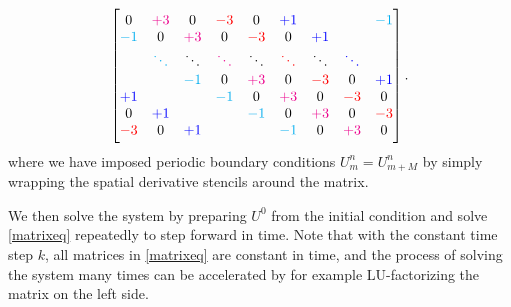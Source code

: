 \begin{equation*}
\begin{bmatrix}
0           & \color{magenta} +3      & 0           & \color{red} -3      & 0           & \color{blue} +1      &             &             & \color{cyan} -1      \\
\color{cyan} -1      & 0           & \color{magenta} +3      & 0           & \color{red} -3      & 0           & \color{blue} +1      &             &             \\
            & \color{cyan} \ddots  & \ddots      & \color{magenta} \ddots  & \ddots      & \color{red} \ddots  & \ddots      & \color{blue} \ddots  &             \\
            &             & \color{cyan} -1      & 0           & \color{magenta} +3      & 0           & \color{red} -3      & 0           & \color{blue} +1      \\
\color{blue} +1      &             &             & \color{cyan} -1      & 0           & \color{magenta} +3      & 0           & \color{red} -3      & 0           \\
0           & \color{blue} +1      &             &             & \color{cyan} -1      & 0           & \color{magenta} +3      & 0           & \color{red} -3      \\
\color{red} -3      & 0           & \color{blue} +1      &             &             & \color{cyan} -1      & 0           & \color{magenta} +3      & 0           \\
\end{bmatrix}
.
\end{equation*}
where we have imposed periodic boundary conditions $U_m^n = U_{m+M}^n$ by simply wrapping the spatial derivative stencils around the matrix.

We then solve the system by preparing $U^0$ from the initial condition and solve \cref{matrixeq} repeatedly to step forward in time.
Note that with the constant time step $k$, all matrices in \cref{matrixeq} are constant in time, and the process of solving the system many times can be accelerated by for example LU-factorizing the matrix on the left side.

\begin{figure}
\end{figure}

